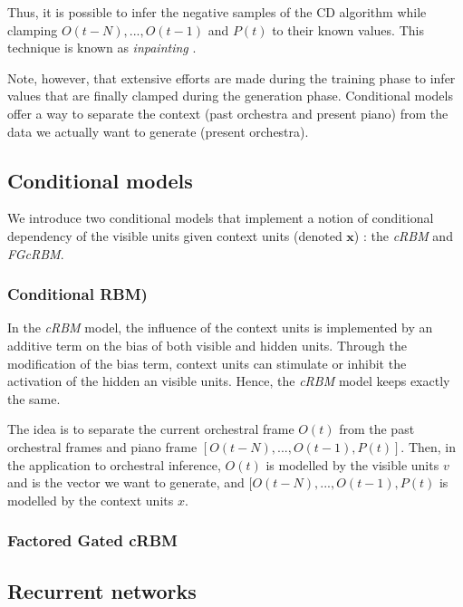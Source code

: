 \documentclass{article}
\begin{document}
Thus, it is possible to infer the negative samples of the CD algorithm while clamping $O(t-N), ..., O(t-1)$ and $P(t)$ to their known values. This technique is known as \textit{inpainting} \cite{Fischer2012}.

Note, however, that extensive efforts are made during the training phase to infer values that are finally clamped during the generation phase. Conditional models offer a way to separate the context (past orchestra and present piano) from the data we actually want to generate (present orchestra).

\subsection{Conditional models}
We introduce two conditional models that implement a notion of conditional dependency of the visible units given context units (denoted $\bm{x}$) :  the \textit{cRBM} and \textit{FGcRBM}.

\subsubsection{Conditional RBM)}
In the \textit{cRBM} model, the influence of the context units is implemented by an additive term on the bias of both visible and hidden units. Through the modification of the bias term, context units can stimulate or inhibit the activation of the hidden an visible units.
Hence, the \textit{cRBM} model keeps exactly the same.


The idea is to separate the current orchestral frame $O(t)$ from the past orchestral frames and piano frame $[O(t-N),...,O(t-1), P(t)]$.
Then, in the application to orchestral inference, $O(t)$ is modelled by the visible units $v$ and is the vector we want to generate, and $[O(t-N),...,O(t-1), P(t)$ is modelled by the context units $x$.



\subsubsection{Factored Gated cRBM}

\subsection{Recurrent networks}
\end{document}
